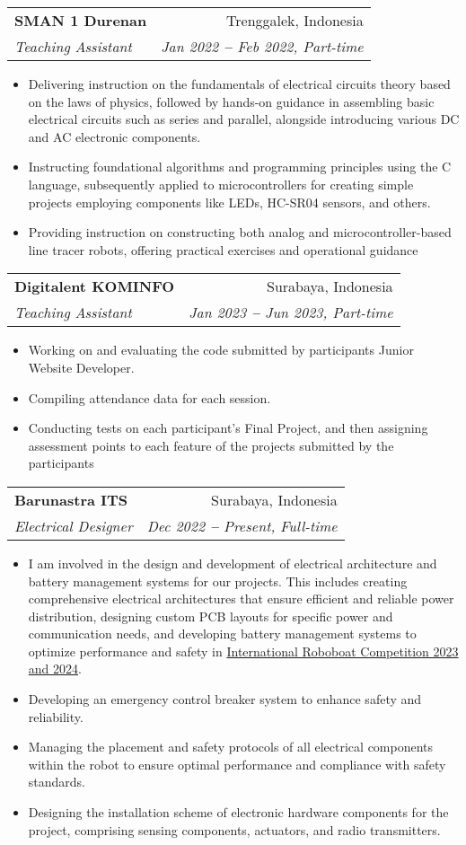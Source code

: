 \documentclass[letterpaper,11pt]{article}
\makeatletter
\newcommand{\resumeItem}[1]{
  \item\small{
    {#1 \vspace{-2pt}}
  }
}
\newcommand{\resumeSubheading}[4]{
  \vspace{-2pt}\item
    \begin{tabular*}{0.97\textwidth}[t]{l@{\extracolsep{\fill}}r}
      \textbf{#1} & #2 \\
      \textit{\small#3} & \textit{\small #4} \\
    \end{tabular*}\vspace{-7pt}
}
\newcommand{\resumeItemListStart}{\begin{itemize}}
\newcommand{\resumeItemListEnd}{\end{itemize}\vspace{-5pt}}
\makeatother
\begin{document}
    \resumeSubheading
      {SMAN 1 Durenan}{Trenggalek, Indonesia}
      {Teaching Assistant}{Jan 2022 \textbf{--} Feb 2022, Part-time}
        \resumeItemListStart
            \resumeItem{Delivering instruction on the fundamentals of electrical circuits theory based on the laws of physics, followed by hands-on guidance in assembling basic electrical circuits such as series and parallel, alongside introducing various DC and AC electronic components.}
            \resumeItem{Instructing foundational algorithms and programming principles using the C language, subsequently applied to microcontrollers for creating simple projects employing components like LEDs, HC-SR04 sensors, and others.}
            \resumeItem{Providing instruction on constructing both analog and microcontroller-based line tracer robots, offering practical exercises and operational guidance}
        \resumeItemListEnd


    \resumeSubheading
      {Digitalent KOMINFO}{Surabaya, Indonesia}
      {Teaching Assistant}{Jan 2023 \textbf{--} Jun 2023, Part-time}
        \resumeItemListStart
            \resumeItem{Working on and evaluating the code submitted by participants Junior Website Developer.}
            \resumeItem{Compiling attendance data for each session.}
            \resumeItem{Conducting tests on each participant's Final Project, and then assigning assessment points to each feature of the projects submitted by the participants}
        \resumeItemListEnd

    \resumeSubheading
      {Barunastra ITS}{Surabaya, Indonesia}
      {Electrical Designer}{Dec 2022 \textbf{--} Present, Full-time}
        \resumeItemListStart
            \resumeItem{I am involved in the design and development of electrical architecture and battery management systems for our projects. This includes creating comprehensive electrical architectures that ensure efficient and reliable power distribution, designing custom PCB layouts for specific power and communication needs, and developing battery management systems to optimize performance and safety in \href{https://www.detik.com/jatim/jatim-moncer/d-6645458/moncer-barunastra-its-pertahankan-juara-dunia-ke-5-kalinya-di-florida}{\color{blue}International Roboboat Competition 2023 and 2024}.}
            \resumeItem{Developing an emergency control breaker system to enhance safety and reliability.}
            \resumeItem{Managing the placement and safety protocols of all electrical components within the robot to ensure optimal performance and compliance with safety standards.}
            \resumeItem{Designing the installation scheme of electronic hardware components for the project, comprising sensing components, actuators, and radio transmitters.}
        \resumeItemListEnd
\end{document}
